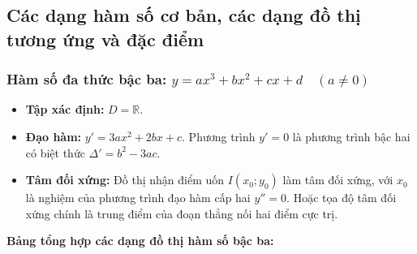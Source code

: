 \documentclass[12pt]{article}
\begin{document}
	
	\subsection{Các dạng hàm số cơ bản, các dạng đồ thị tương ứng và đặc điểm}
	
	\subsubsection{Hàm số đa thức bậc ba: $y = ax^3 + bx^2 + cx + d \quad (a \neq 0)$}
	
	\begin{itemize}
		\item \textbf{Tập xác định:} $D = \mathbb{R}$.
		\item \textbf{Đạo hàm:} $y' = 3ax^2 + 2bx + c$. Phương trình $y' = 0$ là phương trình bậc hai có biệt thức $\Delta' = b^2 - 3ac$.
		\item \textbf{Tâm đối xứng:} Đồ thị nhận điểm uốn $I(x_0; y_0)$ làm tâm đối xứng, với $x_0$ là nghiệm của phương trình đạo hàm cấp hai $y'' = 0$. Hoặc tọa độ tâm đối xứng chính là trung điểm của đoạn thẳng nối hai điểm cực trị.
	\end{itemize}
	
	\textbf{Bảng tổng hợp các dạng đồ thị hàm số bậc ba:}
	
\end{document}
